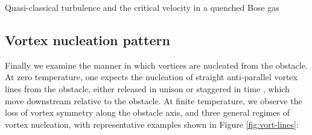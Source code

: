 \begin{chapter}{\label{cha:nonequib}Quasi-classical turbulence and the critical velocity in a quenched Bose gas}
\subsection{Vortex nucleation pattern}
Finally we examine the manner in which vortices are nucleated from the obstacle.  At zero temperature, one expects the nucleation of straight anti-parallel vortex lines from the obstacle, either released in unison or staggered in time \cite{frisch92,saito10,stagg_parker_14}, which move downstream relative to the obstacle.  At finite temperature, we observe the loss of vortex symmetry along the obstacle axis, and three general regimes of vortex nucleation, with representative examples shown in Figure  \ref{fig:vort-lines}:

\begin{figure}
    \centering
\end{figure}
\end{chapter}
